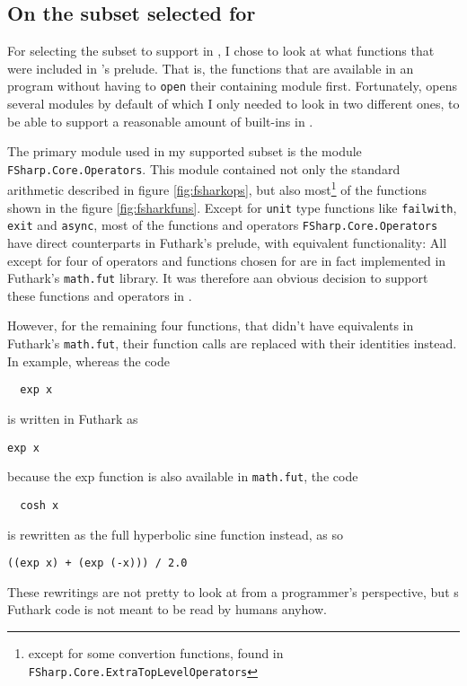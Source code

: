 \subsection*{On the \fsharp{} subset selected for \fshark{}}
For selecting the \fsharp{} subset to support in \fshark{}, I chose to look at
what functions that were included in \fsharp{}'s prelude. That is, the
functions that are available in an \fsharp{} program without having to
\texttt{open} their containing module first.
Fortunately, \fsharp{} opens several modules by default of which I only
needed to look in two different ones, to be able to support a reasonable amount
of \fsharp{} built-ins in \fshark{}.

The primary module used in my supported \fsharp{} subset is the module
\texttt{FSharp.Core.Operators}.
This module contained not only the standard arithmetic described in figure
\ref{fig:fsharkops}, but also most\footnote{except for some convertion
  functions, found in \texttt{FSharp.Core.ExtraTopLevelOperators}} of the functions shown in the figure \ref{fig:fsharkfuns}.
Except for \texttt{unit} type functions like \texttt{failwith}, \texttt{exit}
and \texttt{async}, most of the functions and operators
\texttt{FSharp.Core.Operators} have direct counterparts in Futhark's prelude,
with equivalent functionality: All except for four of operators and functions chosen for
\fshark{} are in fact implemented in Futhark's \texttt{math.fut} library.
It was therefore aan obvious decision to support these functions and operators in
\fshark{}.

However, for the remaining four functions, that didn't have equivalents in
Futhark's \texttt{math.fut}, their function calls are replaced with their
identities instead.
In example, whereas the \fshark{} code
\begin{verbatim}
  exp x
\end{verbatim}
is written in Futhark as 
\begin{lstlisting}[language=Futhark]
  exp x
\end{lstlisting}
because the exp function is also available in \texttt{math.fut}, the \fshark{}
code
\begin{verbatim}
  cosh x
\end{verbatim}
is rewritten as the full hyperbolic sine function instead, as so
\begin{lstlisting}[language=Futhark]
  ((exp x) + (exp (-x))) / 2.0
\end{lstlisting}
These rewritings are not pretty to look at from a programmer's perspective, but
\fshark{}s Futhark code is not meant to be read by humans anyhow.

